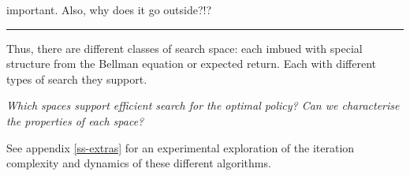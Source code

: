 {\color{red}important. Also, why does it go outside?!?}

\newpage

\begin{center}\rule{0.5\linewidth}{\linethickness}\end{center}

Thus, there are different classes of search space: each imbued with special
structure from the Bellman equation or expected return. Each with different types of search they
support.

\begin{displayquote}
\textit{Which spaces support efficient search for the optimal policy? Can we characterise the properties of each space?}
\end{displayquote}

See appendix \ref{ss-extras} for an experimental exploration of the iteration complexity and dynamics of these different algorithms.
